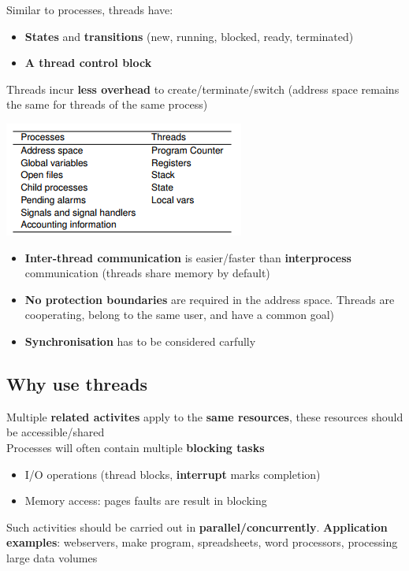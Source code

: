 \documentclass{article}
\begin{document}
\begin{multicols}{2}
Similar to processes, threads have:
\begin{itemize}
	\item \textbf{States} and \textbf{transitions} (new, running, blocked, ready, terminated)
	\item \textbf{A thread control block}
\end{itemize}
Threads incur \textbf{less overhead} to create/terminate/switch (address space remains the same for threads of the same process)
\smallskip
\begin{center}
\includegraphics[scale=0.5]{Selection_007.png}
\end{center}
\end{multicols}

\begin{itemize}
	\item \textbf{Inter-thread communication} is easier/faster than \textbf{interprocess} communication (threads share memory by default)
	\item \textbf{No protection boundaries} are required in the address space. Threads are cooperating, belong to the same user, and have a common goal)
	\item \textbf{Synchronisation} has to be considered carfully
\end{itemize}

\subsection{Why use threads}
\begin{flushleft}
Multiple \textbf{related activites} apply to the \textbf{same resources}, these resources should be accessible/shared\\
Processes will often contain multiple \textbf{blocking tasks}
\begin{itemize}
	\item I/O operations (thread blocks, \textbf{interrupt} marks completion)
	\item Memory access: pages faults are result in blocking
\end{itemize}
Such activities should be carried out in \textbf{parallel/concurrently}. \textbf{Application examples}: webservers, make program, spreadsheets, word processors, processing large data volumes
\end{flushleft}
\end{document}
